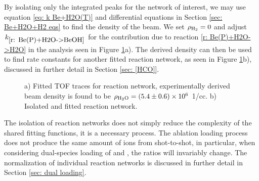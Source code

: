 By isolating only the integrated peaks for the  network of interest, we may use equation \ref{eq: k Be+H2O(T)} and differential equations in Section \ref{sec: Be+H2O+H2 eqs} to find the density of the  beam. We set $\rho_{\ce{H2}}=0$ and adjust $k_{\ref{r: Be(P)+H2O->BeOH}}$ for the contribution due to reaction \ref{r: Be(P)+H2O->H2O} in the analysis seen in Figure \ref{fig: Be+C+H2O+CO traces}a). The derived density can then be used to find rate constants for another fitted reaction network, as seen in Figure \ref{fig: Be+C+H2O+CO traces}b), discussed in further detail in Section \ref{sec: [HCO]}.

\begin{figure}[H]
	\centering
	\caption{a) Fitted TOF traces for  reaction network, experimentally derived  beam density is found to be $\rho_{\ce{H2O}}=(5.4 \pm 0.6) \times 10^6$ 1/cc. b) Isolated and fitted  reaction network.}
	\label{fig: Be+C+H2O+CO traces}
\end{figure}

The isolation of reaction networks does not simply reduce the complexity of the shared fitting functions, it is a necessary process. The ablation loading process does not produce the same amount of ions from shot-to-shot, in particular, when considering dual-species loading of  and , the ratios will invariably change. The normalization of individual reaction networks is discussed in further detail in Section \ref{sec: dual loading}.